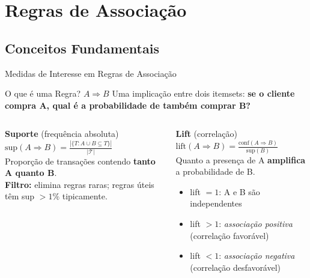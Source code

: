 \documentclass[aspectratio=169]{beamer}
\begin{document}
\section{Regras de Associação}

\subsection{Conceitos Fundamentais}




\begin{frame}{Medidas de Interesse em Regras de Associação}
    \begin{block}{O que é uma Regra? $A \Rightarrow B$}
        \footnotesize
        Uma implicação entre dois itemsets: \textbf{se o cliente compra A, qual é a probabilidade de também comprar B?}
    \end{block}
    \pause
    \begin{columns}
        \begin{block}{\textbf{Suporte} (frequência absoluta)}
            \footnotesize
            $\text{sup}(A \Rightarrow B) = \frac{|\{T: A \cup B \subseteq T\}|}{|\mathcal{T}|}$\\[4pt]
            Proporção de transações contendo \textbf{tanto A quanto B}.\\[4pt]
            \textbf{Filtro:} elimina regras raras; regras úteis têm sup $> 1\%$ tipicamente.
        \end{block}      
        \pause
        \begin{block}{\textbf{Lift} (correlação)}
            \footnotesize
            $\text{lift}(A \Rightarrow B) = \frac{\text{conf}(A \Rightarrow B)}{\text{sup}(B)}$\\[4pt]
            Quanto a presença de A \textbf{amplifica} a probabilidade de B.\\[4pt]
            \begin{itemize}\footnotesize
                \item lift $= 1$: A e B são independentes
                \item lift $> 1$: \textit{associação positiva} (correlação favorável)
                \item lift $< 1$: \textit{associação negativa} (correlação desfavorável)
            \end{itemize}
        \end{block}
       
    \end{columns}
\end{frame}
\end{document}
